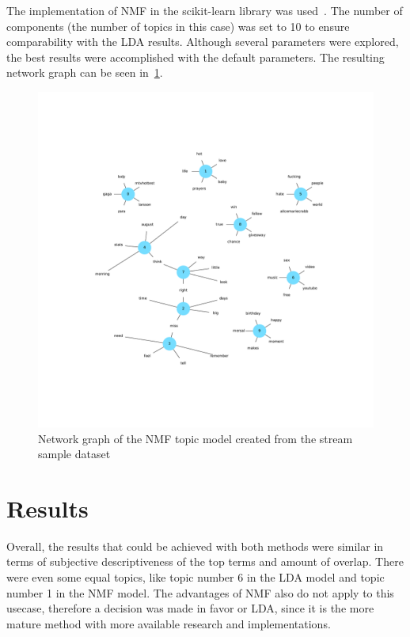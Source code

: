 The implementation of NMF in the scikit-learn library was used~\cite{scikitDocs}.
The number of components (the number of topics in this case) was set to 10 to ensure comparability with the LDA results.
Although several parameters were explored, the best results were accomplished with the default parameters.
The resulting network graph can be seen in~\ref{fig:nmf_network_graph}.

\begin{figure}
    \centering
    \caption{Network graph of the NMF topic model created from the stream sample dataset}
    \label{fig:nmf_network_graph}
    \includegraphics[width=\textwidth]{../figures/nmf_network_graph.pdf}
\end{figure}

\section{Results}
\label{sec:results}

Overall, the results that could be achieved with both methods were similar in terms of subjective descriptiveness of the top terms and amount of overlap.
There were even some equal topics, like topic number 6 in the LDA model and topic number 1 in the NMF model.
The advantages of NMF also do not apply to this usecase, therefore a decision was made in favor or LDA,
since it is the more mature method with more available research and implementations. %